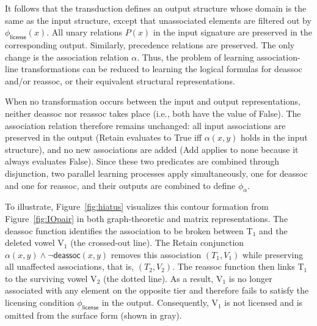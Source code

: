 It follows that the transduction defines an output structure whose
domain is the same as the input structure, except that unassociated
elements are filtered out by $\phi_{\textsf{license}}(x)$. All unary
relations \(P(x)\) in the input signature are preserved in the
corresponding output. Similarly, precedence relations are preserved. The
only change is the association relation \(\alpha\). Thus, the problem of
learning association-line transformations can be reduced to learning the
logical formulas for \textsf{deassoc} and/or \textsf{reassoc}, or their
equivalent structural representations.

When no transformation occurs between the input and output
representations, neither \textsf{deassoc} nor \textsf{reassoc} takes
place (i.e., both have the value of False). The association relation
therefore remains unchanged: all input associations are preserved in the
output (\textsf{Retain} evaluates to True iff \(\alpha(x,y)\) holds in
the input structure), and no new associations are added (\textsf{Add}
applies to none because it always evaluates False). Since these two
predicates are combined through disjunction, two parallel learning
processes apply simultaneously, one for \textsf{deassoc} and one for
\textsf{reassoc}, and their outputs are combined to define
$\phi_\alpha$.

To illustrate,
Figure~\ref{fig:hiatus} visualizes this contour formation from
Figure~\ref{fig:IOpair} in both graph-theoretic and matrix
representations.
The \textsf{deassoc} function identifies the association to be broken
between T$_1$ and the deleted vowel V$_1$ (the crossed-out line). The
\textsf{Retain} conjunction $\alpha(x,y)\land\neg\textsf{deassoc}(x,y)$
removes this association $(T_1,V_1)$ while preserving all unaffected
associations, that is, $(T_2,V_2)$. The \textsf{reassoc} function then
links T$_1$ to the surviving vowel V$_2$ (the dotted line). As a result,
V$_1$ is no longer associated with any element on the opposite tier and
therefore fails to satisfy the licensing condition
$\phi_{\textsf{license}}$ in the output. Consequently, V$_1$ is not
licensed and is omitted from the surface form (shown in gray).

